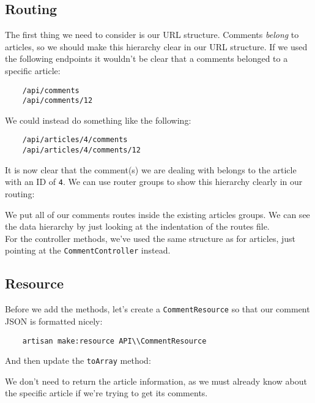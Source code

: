 \subsection{Routing}

The first thing we need to consider is our URL structure. Comments \textit{belong} to articles, so we should make this hierarchy clear in our URL structure. If we used the following endpoints it wouldn't be clear that a comments belonged to a specific article:

\begin{verbatim}
    /api/comments
    /api/comments/12
\end{verbatim}

We could instead do something like the following:

\begin{verbatim}
    /api/articles/4/comments
    /api/articles/4/comments/12
\end{verbatim}

It is now clear that the comment(s) we are dealing with belongs to the article with an ID of \texttt{4}. We can use router groups to show this hierarchy clearly in our routing:


We put all of our comments routes inside the existing articles groups. We can see the data hierarchy by just looking at the indentation of the routes file.
\\

For the controller methods, we've used the same structure as for articles, just pointing at the \texttt{CommentController} instead.


\subsection{Resource}

Before we add the methods, let's create a \texttt{CommentResource} so that our comment JSON is formatted nicely:

\begin{verbatim}
    artisan make:resource API\\CommentResource
\end{verbatim}

And then update the \texttt{toArray} method:


We don't need to return the article information, as we must already know about the specific article if we're trying to get its comments.

